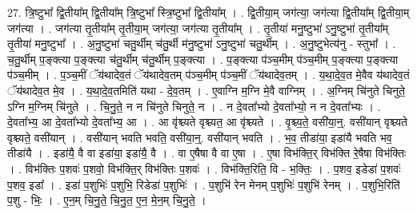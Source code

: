 \documentclass[17pt]{extarticle}
\begin{document}
27. त्रि॒ष्टुभा᳚ द्वि॒तीया᳚म् द्वि॒तीया᳚म् त्रि॒ष्टुभा᳚ स्त्रि॒ष्टुभा᳚ द्वि॒तीया᳚म् । . द्वि॒तीया॒म् जग॑त्या॒ जग॑त्या द्वि॒तीया᳚म् द्वि॒तीया॒म् जग॑त्या । . जग॑त्या तृ॒तीया᳚म् तृ॒तीया॒म् जग॑त्या॒ जग॑त्या तृ॒तीया᳚म् । . तृ॒तीया॑ मनु॒ष्टुभा॑ ऽनु॒ष्टुभा॑ तृ॒तीया᳚म् तृ॒तीया॑ मनु॒ष्टुभा᳚ । . अ॒नु॒ष्टुभा॑ चतु॒र्थीम् च॑तु॒र्थी म॑नु॒ष्टुभा॑ ऽनु॒ष्टुभा॑ चतु॒र्थीम् । . अ॒नु॒ष्टुभेत्य॑नु - स्तुभा᳚ । . च॒तु॒र्थीम् प॒ङ्क्त्या प॒ङ्क्त्या च॑तु॒र्थीम् च॑तु॒र्थीम् प॒ङ्क्त्या । . प॒ङ्क्त्या प॑ञ्च॒मीम् प॑ञ्च॒मीम् प॒ङ्क्त्या प॒ङ्क्त्या प॑ञ्च॒मीम् । . प॒ञ्च॒मीं ॅय॑थादेव॒तं ॅय॑थादेव॒तम् प॑ञ्च॒मीम् प॑ञ्च॒मीं ॅय॑थादेव॒तम् । . य॒था॒दे॒व॒त मे॒वैव य॑थादेव॒तं ॅय॑थादेव॒त मे॒व । . य॒था॒दे॒व॒तमिति॑ यथा - दे॒व॒तम् । . ए॒वाग्नि म॒ग्नि मे॒वै वाग्निम् । . अ॒ग्निम् चि॑नुते चिनुते॒ ऽग्नि म॒ग्निम् चि॑नुते । . चि॒नु॒ते॒ न न चि॑नुते चिनुते॒ न । . न दे॒वता᳚भ्यो दे॒वता᳚भ्यो॒ न न दे॒वता᳚भ्यः । . दे॒वता᳚भ्य॒ आ दे॒वता᳚भ्यो दे॒वता᳚भ्य॒ आ । . आ वृ॑श्च्यते वृश्च्यत॒ आ वृ॑श्च्यते । . वृ॒श्च्य॒ते॒ वसी॑या॒न्॒. वसी॑यान् वृश्च्यते वृश्च्यते॒ वसी॑यान् । . वसी॑यान् भवति भवति॒ वसी॑या॒न्॒. वसी॑यान् भवति । . भ॒व॒ तीडा॑या॒ इडा॑यै भवति भव॒ तीडा॑यै । . इडा॑यै॒ वै वा इडा॑या॒ इडा॑यै॒ वै । . वा ए॒षैषा वै वा ए॒षा । . ए॒षा विभ॑क्ति॒र् विभ॑क्ति रे॒षैषा विभ॑क्तिः । . विभ॑क्तिः प॒शवः॑ प॒शवो॒ विभ॑क्ति॒र् विभ॑क्तिः प॒शवः॑ । . विभ॑क्ति॒रिति॒ वि - भ॒क्तिः॒ । . प॒शव॒ इडेडा॑ प॒शवः॑ प॒शव॒ इडा᳚ । . इडा॑ प॒शुभिः॑ प॒शुभि॒ रिडेडा॑ प॒शुभिः॑ । . प॒शुभि॑ रेन मेनम् प॒शुभिः॑ प॒शुभि॑ रेनम् । . प॒शुभि॒रिति॑ प॒शु - भिः॒ । . ए॒न॒म् चि॒नु॒ते॒ चि॒नु॒त॒ ए॒न॒ मे॒न॒म् चि॒नु॒ते॒ । \newline
\end{document}
